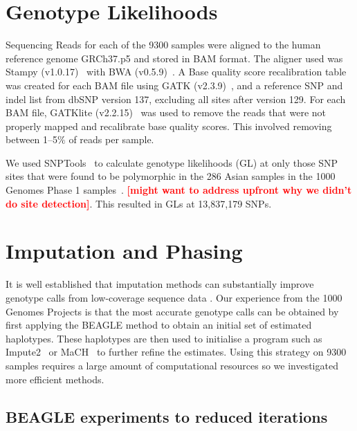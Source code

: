 \documentclass[nobib,a4paper]{tufte-handout}
\newcommand{\red}[1]{\textsf{\textbf{\textcolor{red}{[#1]}}}}
\begin{document}


\section{Genotype Likelihoods}

Sequencing Reads for each of the 9300 samples were aligned to the
human reference genome GRCh37.p5 and stored in BAM format. 
The aligner used was Stampy (v1.0.17)~\autocite{Lunter2011} with
BWA (v0.5.9)~\autocite{Li2009}. 
A Base quality score recalibration table was created for each BAM file
using GATK (v2.3.9)~\autocite{McKenna2010,Trio2011}, and a
reference SNP and indel list from dbSNP version 137, excluding all
  sites after version 129. 
For each BAM file, GATKlite (v2.2.15)~\autocite{McKenna2010,Trio2011} was
used to remove the reads that were not properly mapped and recalibrate
base quality scores. This involved removing between 1--5$\%$ of reads
per sample. 

We used SNPTools~\autocite{Wang2013} to calculate genotype likelihoods (GL) at only those
SNP sites that were found to be polymorphic in the 286 Asian samples
in the 1000 Genomes Phase 1 samples~\autocite{Project2012}. \red{might want to
  address upfront why we didn't do site detection}. This resulted in
GLs at 13,837,179 SNPs. 

\section{Imputation and Phasing}

It is well established that imputation methods can substantially
improve genotype calls from low-coverage sequence data
\autocite{Project2012, Li2010, Wang2013}.
Our experience from the 1000 Genomes Projects is that the most
accurate genotype calls can be obtained by first applying the BEAGLE
method to obtain an initial set of estimated haplotypes. These
haplotypes are then used to initialise a program such as
Impute2~\autocite{Howie2009} or MaCH~\autocite{Li2010} to further refine the
estimates. 
Using this strategy on 9300 samples requires a large amount of
computational resources so we investigated more efficient methods.  

\subsection{BEAGLE experiments to reduced iterations}
\end{document}
